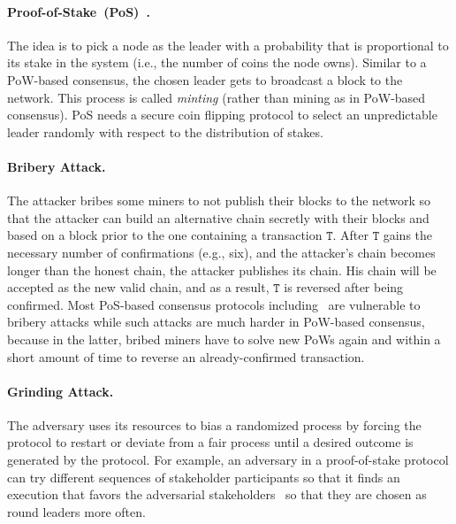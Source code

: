\documentclass[11pt]{article}
\theoremstyle{mytheoremstyle}
\begin{document}
\paragraph{Proof-of-Stake~(PoS)~\cite{cryptoeprint:2016:889}.} The idea is to pick a node as the leader with a probability that is proportional to its stake in the system (i.e., the number of coins the node owns). Similar to a PoW-based consensus, the chosen leader gets to broadcast a block to the network. This process is called \emph{minting} (rather than mining as in PoW-based consensus). PoS needs a secure coin flipping protocol to select an unpredictable leader randomly with respect to the distribution of stakes.

\paragraph{Bribery Attack.} The attacker bribes some miners to not publish their blocks to the network so that the attacker can build an alternative chain secretly with their blocks and based on a block prior to the one containing a transaction $\mathtt{T}$. After $\mathtt{T}$ gains the necessary number of confirmations (e.g., six), and the attacker's chain becomes longer than the honest chain, the attacker publishes its chain. His chain will be accepted as the new valid chain, and as a result, $\mathtt{T}$ is reversed after being confirmed. Most PoS-based consensus protocols including~\cite{cryptoeprint:2016:889,algorand16} are vulnerable to bribery attacks while such attacks are much harder in PoW-based consensus, because in the latter, bribed miners have to solve new PoWs again and within a short amount of time to reverse an already-confirmed transaction.

\paragraph{Grinding Attack.} The adversary uses its resources to bias a randomized process by forcing the protocol to restart or deviate from a fair process until a desired outcome is generated by the protocol. For example, an adversary in a proof-of-stake protocol can try different sequences of stakeholder participants so that it finds an execution that favors the adversarial stakeholders~\cite{kiayias2017ouroboros} so that they are chosen as round leaders more often.
\end{document}
